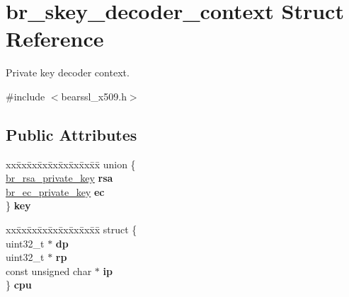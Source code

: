 \hypertarget{structbr__skey__decoder__context}{}\section{br\+\_\+skey\+\_\+decoder\+\_\+context Struct Reference}
\label{structbr__skey__decoder__context}


Private key decoder context.  




{\ttfamily \#include $<$bearssl\+\_\+x509.\+h$>$}

\subsection*{Public Attributes}
\begin{DoxyCompactItemize}
\item 
\mbox{\label{structbr__skey__decoder__context_ad792ce74a8b4c26134fe97bd9b9132ed}} 
\begin{tabbing}
xx\=xx\=xx\=xx\=xx\=xx\=xx\=xx\=xx\=\kill
union \{\\
\>\hyperlink{structbr__rsa__private__key}{br\_rsa\_private\_key} {\bfseries rsa}\\
\>\hyperlink{structbr__ec__private__key}{br\_ec\_private\_key} {\bfseries ec}\\
\} {\bfseries key}\\

\end{tabbing}\item 
\mbox{\label{structbr__skey__decoder__context_aba258aed7c1c52d4d216605df88a7ace}} 
\begin{tabbing}
xx\=xx\=xx\=xx\=xx\=xx\=xx\=xx\=xx\=\kill
struct \{\\
\>uint32\_t $\ast$ {\bfseries dp}\\
\>uint32\_t $\ast$ {\bfseries rp}\\
\>const unsigned char $\ast$ {\bfseries ip}\\
\} {\bfseries cpu}\\


\end{tabbing}
\end{DoxyCompactItemize}
